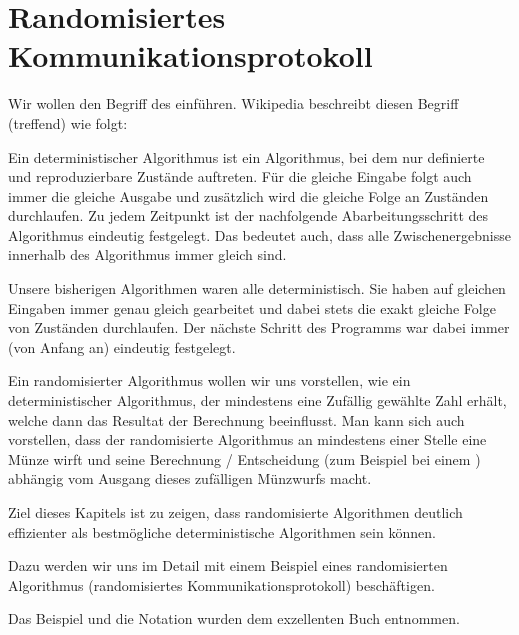 \chapter{Randomisiertes Kommunikationsprotokoll}
Wir wollen den Begriff des  einführen. Wikipedia beschreibt diesen Begriff (treffend) wie folgt:

\begin{mydefinition}
Ein deterministischer Algorithmus ist ein Algorithmus, bei dem nur definierte und reproduzierbare Zustände auftreten.
Für die gleiche Eingabe folgt auch immer die gleiche Ausgabe und zusätzlich wird die gleiche Folge an Zuständen durchlaufen.
Zu jedem Zeitpunkt ist der nachfolgende Abarbeitungsschritt des Algorithmus eindeutig festgelegt.
Das bedeutet auch, dass alle Zwischenergebnisse innerhalb des Algorithmus immer gleich sind.
\end{mydefinition}

Unsere bisherigen Algorithmen waren alle deterministisch. Sie haben auf gleichen Eingaben immer genau gleich gearbeitet und dabei stets die exakt gleiche Folge von Zuständen durchlaufen. Der nächste Schritt des Programms war dabei immer (von Anfang an) eindeutig festgelegt.

Ein randomisierter Algorithmus wollen wir uns vorstellen, wie ein deterministischer Algorithmus, der mindestens eine Zufällig gewählte Zahl erhält, welche dann das Resultat der Berechnung beeinflusst.
Man kann sich auch vorstellen, dass der randomisierte Algorithmus an mindestens einer Stelle eine Münze wirft und seine Berechnung / Entscheidung (zum Beispiel bei einem ) abhängig vom Ausgang dieses zufälligen Münzwurfs macht.

Ziel dieses Kapitels ist zu zeigen, dass randomisierte Algorithmen deutlich effizienter als bestmögliche deterministische Algorithmen sein können.

Dazu werden wir uns im Detail mit einem Beispiel eines randomisierten Algorithmus (randomisiertes Kommunikationsprotokoll) beschäftigen.

Das Beispiel und die Notation wurden dem exzellenten Buch \cite{Kodierungen} entnommen.

